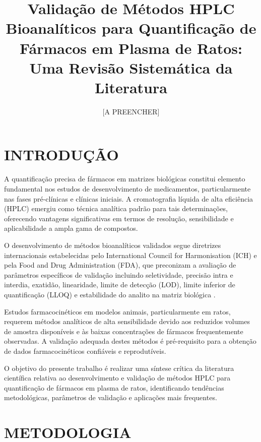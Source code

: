 \graphicspath{{./Figures/}{./logo/}}

\title{Validação de Métodos HPLC Bioanalíticos para Quantificação de Fármacos em Plasma de Ratos: Uma Revisão Sistemática da Literatura}

\author[1]{[A PREENCHER]}
\affil[1]{[A PREENCHER]}



\maketitle

\section{INTRODUÇÃO}

A quantificação precisa de fármacos em matrizes biológicas constitui elemento fundamental nos estudos de desenvolvimento de medicamentos, particularmente nas fases pré-clínicas e clínicas iniciais. A cromatografia líquida de alta eficiência (HPLC) emergiu como técnica analítica padrão para tais determinações, oferecendo vantagens significativas em termos de resolução, sensibilidade e aplicabilidade a ampla gama de compostos.

O desenvolvimento de métodos bioanalíticos validados segue diretrizes internacionais estabelecidas pelo International Council for Harmonisation (ICH) e pela Food and Drug Administration (FDA), que preconizam a avaliação de parâmetros específicos de validação incluindo seletividade, precisão intra e interdia, exatidão, linearidade, limite de detecção (LOD), limite inferior de quantificação (LLOQ) e estabilidade do analito na matriz biológica \cite{ich2005, fda2018}.

Estudos farmacocinéticos em modelos animais, particularmente em ratos, requerem métodos analíticos de alta sensibilidade devido aos reduzidos volumes de amostra disponíveis e às baixas concentrações de fármacos frequentemente observadas. A validação adequada destes métodos é pré-requisito para a obtenção de dados farmacocinéticos confiáveis e reprodutíveis.

O objetivo do presente trabalho é realizar uma síntese crítica da literatura científica relativa ao desenvolvimento e validação de métodos HPLC para quantificação de fármacos em plasma de ratos, identificando tendências metodológicas, parâmetros de validação e aplicações mais frequentes.

\section{METODOLOGIA}

